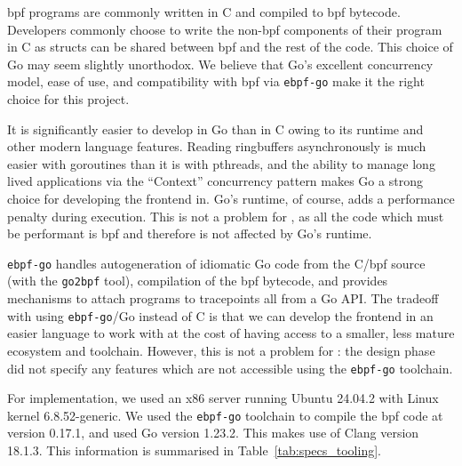 \ac{bpf} programs are commonly written in C and compiled to \ac{bpf} bytecode.
Developers commonly choose to write the non-\ac{bpf} components of their program
in C as structs can be shared between \ac{bpf} and the rest of the code.
This choice of Go may seem slightly unorthodox. We believe that Go's
excellent concurrency model, ease of use, and compatibility with \ac{bpf} via
\texttt{ebpf-go} make it the right choice for this project. 

It is significantly easier to develop in Go than in C owing to its runtime and other 
modern language features. Reading ringbuffers asynchronously is much easier with 
goroutines than it is with pthreads, and the ability to manage long lived applications 
via the  ``Context'' concurrency pattern makes Go a strong choice for developing the 
frontend in. Go's runtime, of course, adds a performance penalty during execution. This  is not a problem for \afss, as all the code which must be performant is \ac{bpf} 
and therefore is not affected by Go's runtime. 

\texttt{ebpf-go} handles autogeneration of idiomatic Go code from the C/\ac{bpf}
source (with the \texttt{go2bpf} tool),
compilation of the \ac{bpf} bytecode, and provides mechanisms to attach programs
to tracepoints all from a Go API. The tradeoff with using
\texttt{ebpf-go}/Go instead of C is that we can develop the frontend in an
easier language to work with at the cost of having access to a smaller, less
mature ecosystem and toolchain. However, this is not a problem for \afss: the
design phase did not specify any features which are not accessible using the
\texttt{ebpf-go} toolchain. 

For implementation, we used an x86 server running Ubuntu 24.04.2 with Linux
kernel 6.8.52-generic. We used the \texttt{ebpf-go} toolchain to compile the
\ac{bpf} code at version 0.17.1, and used Go version 1.23.2. This makes use of
Clang version 18.1.3. This information is summarised in
Table~\ref{tab:specs_tooling}.

